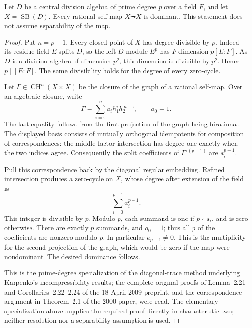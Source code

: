 \begin{lemma}
\label{lem:prime-Severi-Brauer-diagonal-trace}
Let \(D\) be a central division algebra of prime degree \(p\)
over a field \(F\), and let \(X=\operatorname{SB}(D)\).
Every rational self-map \(X\dashrightarrow X\) is dominant.
This statement does not assume separability of the map.
\end{lemma}
\begin{proof}
Put \(n=p-1\). Every closed point of \(X\) has degree divisible
by \(p\). Indeed its residue field \(E\) splits \(D\), so the
left \(D\)-module \(E^p\) has \(F\)-dimension \(p[E:F]\).
As \(D\) is a division algebra of dimension \(p^2\), this
dimension is divisible by \(p^2\). Hence \(p\mid[E:F]\).
The same divisibility holds for the degree of every zero-cycle.

Let \(\Gamma\in\operatorname{CH}^n(X\times X)\) be the closure
of the graph of a rational self-map. Over an algebraic closure,
write
\[
 \overline\Gamma=\sum_{i=0}^{n}a_i h_1^i h_2^{\,n-i},
                 \qquad a_0=1.                 \tag{PHR7}
\]
The last equality follows from the first projection of the graph
being birational. The displayed basis consists of mutually
orthogonal idempotents for composition of correspondences:
the middle-factor intersection has degree one exactly when
the two indices agree. Consequently the split coefficients of
\(\Gamma^{\circ(p-1)}\) are \(a_i^{p-1}\).

Pull this correspondence back by the diagonal regular embedding.
Refined intersection produces a zero-cycle on \(X\), whose
degree after extension of the field is
\[
                         \sum_{i=0}^{p-1}a_i^{p-1}.
                                                        \tag{PHR8}
\]
This integer is divisible by \(p\). Modulo \(p\), each summand
is one if \(p\nmid a_i\), and is zero otherwise. There are
exactly \(p\) summands, and \(a_0=1\); thus all \(p\) of the
coefficients are nonzero modulo \(p\). In particular
\(a_{p-1}\ne0\). This is the multiplicity for the second
projection of the graph, which would be zero if the map were
nondominant. The desired dominance follows.

This is the prime-degree specialization of the diagonal-trace
method underlying Karpenko's incompressibility results; the
complete original proofs of Lemma~2.21 and Corollaries~2.22--2.24
of the 18 April 2009 preprint, and the correspondence argument
in Theorem~2.1 of the 2000 paper, were read. The elementary
specialization above supplies the required proof directly in
characteristic two; neither resolution nor a separability
assumption is used.
\end{proof}

